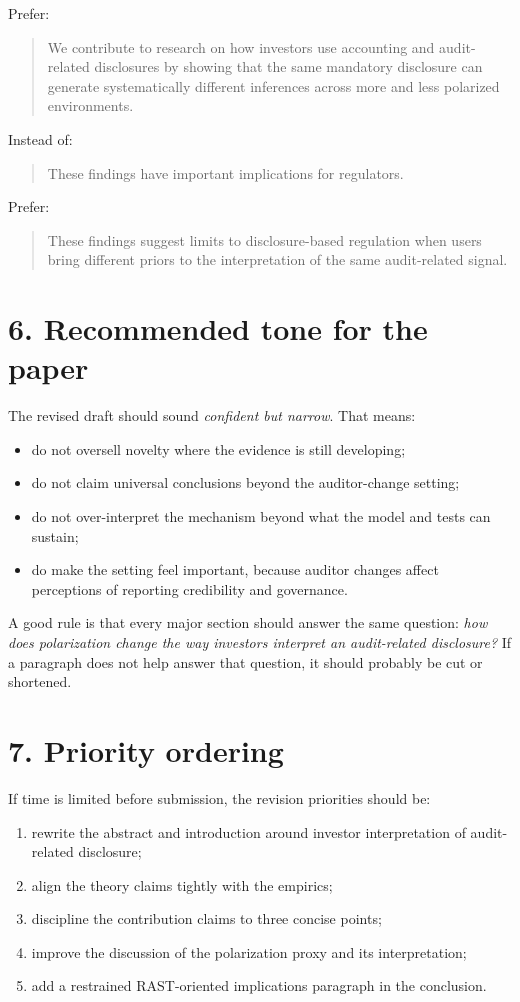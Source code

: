 \documentclass[11pt]{article}
\begin{document}
Prefer:
\begin{quote}
We contribute to research on how investors use accounting and audit-related disclosures by showing that the same mandatory disclosure can generate systematically different inferences across more and less polarized environments.
\end{quote}

Instead of:
\begin{quote}
These findings have important implications for regulators.
\end{quote}

Prefer:
\begin{quote}
These findings suggest limits to disclosure-based regulation when users bring different priors to the interpretation of the same audit-related signal.
\end{quote}

\section*{6. Recommended tone for the paper}

The revised draft should sound \emph{confident but narrow}. That means:
\begin{itemize}[leftmargin=1.5em]
    \item do not oversell novelty where the evidence is still developing;
    \item do not claim universal conclusions beyond the auditor-change setting;
    \item do not over-interpret the mechanism beyond what the model and tests can sustain;
    \item do make the setting feel important, because auditor changes affect perceptions of reporting credibility and governance.
\end{itemize}

A good rule is that every major section should answer the same question: \emph{how does polarization change the way investors interpret an audit-related disclosure?} If a paragraph does not help answer that question, it should probably be cut or shortened.

\section*{7. Priority ordering}

If time is limited before submission, the revision priorities should be:

\begin{enumerate}[leftmargin=1.5em]
    \item rewrite the abstract and introduction around investor interpretation of audit-related disclosure;
    \item align the theory claims tightly with the empirics;
    \item discipline the contribution claims to three concise points;
    \item improve the discussion of the polarization proxy and its interpretation;
    \item add a restrained RAST-oriented implications paragraph in the conclusion.
\end{enumerate}
\end{document}
